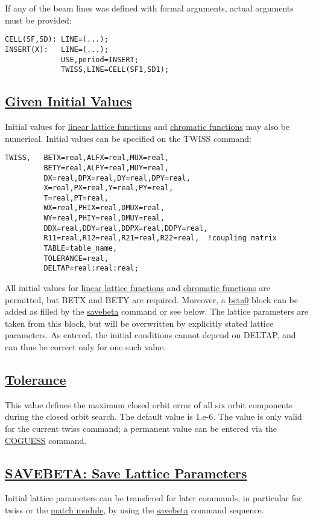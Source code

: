 If any of the beam lines was defined with formal arguments, actual arguments must be provided: 
\begin{verbatim}
CELL(SF,SD): LINE=(...);
INSERT(X):   LINE=(...);
             USE,period=INSERT;
             TWISS,LINE=CELL(SF1,SD1);
\end{verbatim}

\subsection{\href{initial}{Given Initial Values}} Initial values for \href{../Introduction/tables.html#linear}{linear lattice functions} and \href{../Introduction/tables.html#chrom}{chromatic functions} may also be numerical. Initial values can be specified on the TWISS command: 


\begin{verbatim}
TWISS,   BETX=real,ALFX=real,MUX=real,
         BETY=real,ALFY=real,MUY=real,
         DX=real,DPX=real,DY=real,DPY=real,
         X=real,PX=real,Y=real,PY=real,
         T=real,PT=real,
         WX=real,PHIX=real,DMUX=real,
         WY=real,PHIY=real,DMUY=real,
         DDX=real,DDY=real,DDPX=real,DDPY=real,
         R11=real,R12=real,R21=real,R22=real,  !coupling matrix
         TABLE=table_name,
         TOLERANCE=real,
         DELTAP=real:real:real;
\end{verbatim} All initial values for \href{../Introduction/tables.html#linear}{linear lattice functions} and \href{../Introduction/tables.html#chrom}{chromatic functions} are permitted, but BETX and BETY are required. Moreover, a \href{beta0}{beta0} block can be added as filled by the \href{../control/general.html#savebeta}{savebeta} command or see below. The lattice parameters are taken from this block, but will be overwritten by explicitly stated lattice parameters. As entered, the initial conditions cannot depend on DELTAP, and can thus be correct only for one such value. 

\subsection{\href{tolerance}{Tolerance}} This value defines the maximum closed orbit error of all six orbit components during the closed orbit search. The default value is 1.e-6. The value is only valid for the current twiss command; a permanent value can be entered via the \href{../control/general.html#coguess}{COGUESS} command. 

\subsection{\href{savebeta}{SAVEBETA: Save Lattice Parameters}} Initial lattice parameters can be transfered for later commands, in particular for twiss or the \href{../match/match.html}{match module}, by using the \href{../control/general.html#savebeta}{savebeta} command sequence. 

